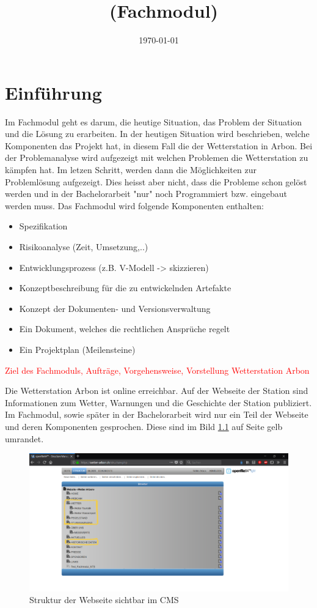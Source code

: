 \documentclass[a4paper,ngerman, 11pt, pagesize]{report}
\title{\projektName~(Fachmodul)}
\author{\authorName}
\date{\today}
\newcommand\Diskussionspunkt[1]{\textcolor{red}{#1}}
\begin{document}

\setcounter{page}{2}
\tableofcontents          
\clearpage
{}


\chapter{Einführung}

Im Fachmodul geht es darum, die heutige Situation, das Problem der Situation und die Lösung zu erarbeiten. In der heutigen Situation wird beschrieben, welche Komponenten das Projekt hat, in diesem Fall die der Wetterstation in Arbon. Bei der Problemanalyse wird aufgezeigt mit welchen Problemen die Wetterstation zu kämpfen hat. Im letzen Schritt, werden dann die Möglichkeiten zur Problemlösung aufgezeigt. Dies heisst aber nicht, dass die Probleme schon gelöst werden und in der Bachelorarbeit "nur" noch Programmiert bzw. eingebaut werden muss. Das Fachmodul wird folgende Komponenten enthalten:
 
\begin{itemize}  
\item Spezifikation
\item Risikoanalyse (Zeit, Umsetzung,..)
\item Entwicklungsprozess (z.B. V-Modell -> skizzieren)
\item Konzeptbeschreibung für die zu entwickelnden Artefakte
\item Konzept der Dokumenten- und Versionsverwaltung
\item Ein Dokument, welches die rechtlichen Ansprüche regelt
\item Ein Projektplan (Meilensteine)
\end{itemize}
\Diskussionspunkt{Ziel des Fachmoduls, Aufträge, Vorgehensweise, Vorstellung Wetterstation Arbon}

Die Wetterstation Arbon ist online erreichbar. Auf der Webseite der Station sind Informationen zum Wetter, Warnungen und die Geschichte der Station publiziert. Im Fachmodul, sowie später in der Bachelorarbeit wird nur ein Teil der Webseite und deren Komponenten gesprochen. Diese sind im Bild \ref{img:cms_struktur} auf Seite \pageref{img:cms_struktur} gelb umrandet. 
\begin{figure}[htbp]
	\centering
	\includegraphics[width=0.9\linewidth]{img/cms_struktur}
	\caption{Struktur der Webseite sichtbar im CMS}
	\label{img:cms_struktur}
\end{figure}
\end{document}
